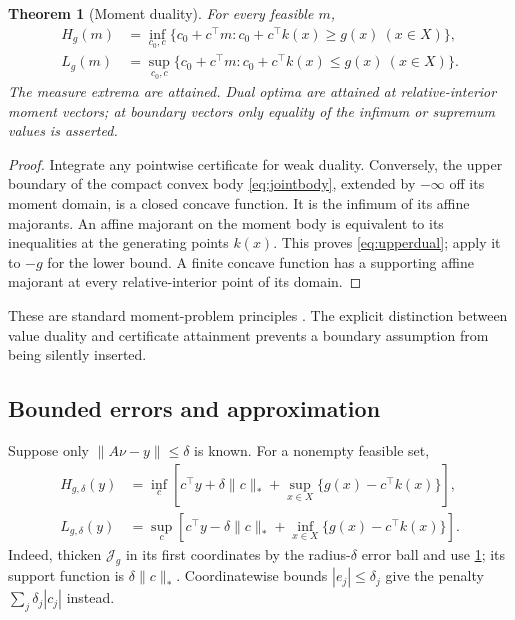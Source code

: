 \documentclass[11pt]{article}
\numberwithin{equation}{section}
\newtheorem{theorem}{Theorem}[section]
\theoremstyle{definition}
\theoremstyle{remark}
\begin{document}
\begin{theorem}[Moment duality]\label{thm:momentdual}
For every feasible $m$,
\begin{align}
 H_g(m)&=\inf_{c_0,c}\{c_0+c^\top m:c_0+c^\top k(x)\ge g(x)\ (x\in X)\},\label{eq:upperdual}\\
 L_g(m)&=\sup_{c_0,c}\{c_0+c^\top m:c_0+c^\top k(x)\le g(x)\ (x\in X)\}.
\end{align}
The measure extrema are attained. Dual optima are attained at relative-interior moment vectors; at boundary vectors only equality of the infimum or supremum values is asserted.
\end{theorem}
\begin{proof}
Integrate any pointwise certificate for weak duality. Conversely, the upper boundary of the compact convex body \eqref{eq:jointbody}, extended by $-\infty$ off its moment domain, is a closed concave function. It is the infimum of its affine majorants. An affine majorant on the moment body is equivalent to its inequalities at the generating points $k(x)$. This proves \eqref{eq:upperdual}; apply it to $-g$ for the lower bound. A finite concave function has a supporting affine majorant at every relative-interior point of its domain.
\end{proof}
These are standard moment-problem principles \cite{BertsimasPopescu2005}. The explicit distinction between value duality and certificate attainment prevents a boundary assumption from being silently inserted.

\subsection{Bounded errors and approximation}
Suppose only $\|A\nu-y\|\le\delta$ is known. For a nonempty feasible set,
\begin{align}
 H_{g,\delta}(y)
 &=\inf_c\left[c^\top y+\delta\|c\|_*+
       \sup_{x\in X}\{g(x)-c^\top k(x)\}\right],\label{eq:noisydual}\\
 L_{g,\delta}(y)
 &=\sup_c\left[c^\top y-\delta\|c\|_*+
       \inf_{x\in X}\{g(x)-c^\top k(x)\}\right].
\end{align}
Indeed, thicken $\mathcal J_g$ in its first coordinates by the radius-$\delta$ error ball and use \cref{thm:momentdual}; its support function is $\delta\|c\|_*$. Coordinatewise bounds $|e_j|\le\delta_j$ give the penalty $\sum_j\delta_j|c_j|$ instead.
\end{document}
